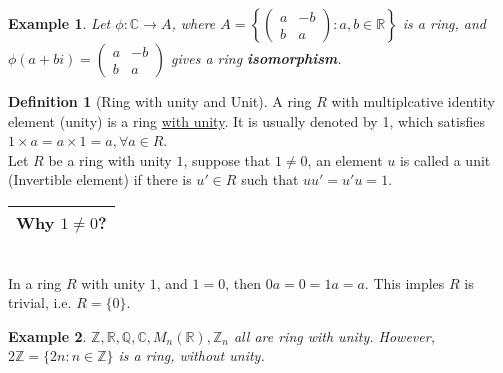 \documentclass{article}
\theoremstyle{MyNonumberplain}
\theoremstyle{break}
\theoremstyle{break}
\newtheorem{example}{Example}[section]
\theoremstyle{break}
\theoremstyle{definition}
\theoremstyle{break}
\newtheorem{definition}{Definition}[section]
\begin{document}
\begin{expbox}
    \begin{example}
        Let $\phi : \mathbb{C} \rightarrow A$, where $A = \left\{
            \left(\begin{array}{cc}
              a & - b\\
              b & a
            \end{array}\right) : a, b \in \mathbb{R} \right\}$ is a ring, and $\phi (a + b i) = \left(\begin{array}{cc}
    a & - b\\
    b & a
\end{array}\right)$ gives a ring \textbf{isomorphism}.
    \end{example}
\end{expbox}

\begin{defbox}
    \begin{definition}[Ring with unity and Unit]
        A ring $R$ with multiplcative identity element (unity) is a ring
        {\underline{with unity}}. It is usually denoted by 1, which satisfies $1
        \times a = a \times 1 = a, \forall a \in R$.\\
        
        Let $R$ be a ring with unity $1$, suppose that $1 \neq 0$, an element $u$ is
        called a unit (Invertible element) if there is $u' \in R$ such that $u u' = u'
        u = 1$.\\
        
        \begin{tabular}{|c|}
          \hline
          Why $1 \neq 0$?\\
          \hline
        \end{tabular}\\
        
        In a ring $R$ with unity $1$, and $1 = 0$, then $0 a = 0 = 1 a = a$. This
        imples $R$ is trivial, i.e. $R = \{ 0 \}$.
    \end{definition}
\end{defbox}

\begin{expbox}
    \begin{example}
        $\mathbb{Z}, \mathbb{R}, \mathbb{Q}, \mathbb{C}, M_n (\mathbb{R}),
        \mathbb{Z}_n$ all are ring with unity. However, $2\mathbb{Z}= \{ 2 n : n \in
        \mathbb{Z} \}$ is a ring, without unity.
    \end{example}
\end{expbox}
\end{document}
